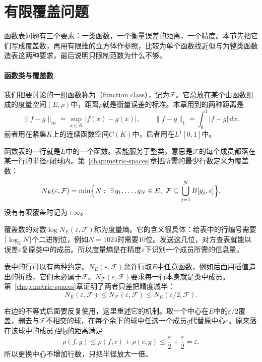 \section{有限覆盖问题}
\label{sec:fcover-problem}

函数表问题有三个要素：一类函数，一个衡量误差的距离，一个精度。本节先把它们写成覆盖数，再用有限维的立方体作参照，比较为单个函数找近似与为整类函数造表这两种要求，最后说明只限制范数为什么不够。

\paragraph{函数类与覆盖数}

我们把要讨论的一组函数称为（function class），记为$\mathcal F$。它总放在某个由函数组成的度量空间$(E,\rho)$中，距离$\rho$就是衡量误差的标准。本章用到的两种距离是
\[
 \lVert f-g\rVert_\infty=\sup_{x\in K}\lvert f(x)-g(x)\rvert,\qquad
 \lVert f-g\rVert_1=\int_0^1\lvert f-g\rvert\,dx .
\]
前者用在紧集$K$上的连续函数空间$C(K)$中，后者用在$L^1[0,1]$中。

函数表的一行就是$E$中的一个函数。表能服务于整类，意思是$\mathcal F$的每个成员都落在某一行的半径$\varepsilon$闭球内。第~\ref{chap:metric-spaces}章把所需的最少行数定义为覆盖数：
\begin{equation}
 N_E(\varepsilon,\mathcal F)=\min\Bigl\{N:\ \exists\,g_1,\ldots,g_N\in E,\
 \mathcal F\subseteq\bigcup_{j=1}^NB[g_j,\varepsilon]\Bigr\},
 \label{eq:fcover-covering-number}
\end{equation}
没有有限覆盖时记为$+\infty$。

覆盖数的对数$\log N_E(\varepsilon,\mathcal F)$称为度量熵。它的含义很具体：给表中的行编号需要$\lceil\log_2N\rceil$个二进制位，例如$N=1024$时需要$10$位。发送这几位，对方查表就能以误差$\varepsilon$复原类中的成员。所以度量熵是在精度$\varepsilon$下识别一个成员所需的信息量。

表中的行可以有两种约定。$N_E(\varepsilon,\mathcal F)$允许行取$E$中任意函数，例如后面用插值造出的折线，它们未必属于$\mathcal F$。$N_{\mathcal F}(\varepsilon,\mathcal F)$要求每一行本身就是类中成员。第~\ref{chap:metric-spaces}章证明了两者只差把精度减半：
\begin{equation}
 N_E(\varepsilon,\mathcal F)\leq N_{\mathcal F}(\varepsilon,\mathcal F)\leq N_E(\varepsilon/2,\mathcal F).
 \label{eq:fcover-center-change}
\end{equation}

右边的不等式后面要反复使用，这里重述它的机制。取一个中心在$E$中的$\varepsilon/2$覆盖，删去与$\mathcal F$不相交的球，在每个余下的球中任选一个成员$g$代替原中心$c$。原来落在该球中的成员$f$到$g$的距离满足
\[
 \rho(f,g)\leq\rho(f,c)+\rho(c,g)\leq\frac\varepsilon2+\frac\varepsilon2=\varepsilon .
\]
所以更换中心不增加行数，只把半径放大一倍。

